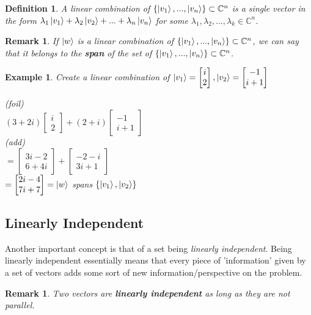 \documentclass[12pt]{article}
\theoremstyle{plain}
\theoremstyle{nonumberplain}
\theoremstyle{plain}
\newtheorem{definition}[lemma]{Definition}
\newtheorem{example}[lemma]{Example}
\newtheorem{remark}[lemma]{Remark}
\theoremstyle{nonumberplain}
\newcommand\1{{\bf 1}}
\newcommand{\bmat}[1]{\begin{bmatrix*} #1 \end{bmatrix*}} %
\newcommand{\C}{\mathbb{C}} %
\newcommand{\<}{\left\langle}
\renewcommand{\>}{\right\rangle}
\begin{document}
\begin{definition}\label{def:li}
A linear combination of $\lbrace\ket{v_1}, ..., \ket{v_n}\rbrace\subset\C^n$ is a single vector in the form $\lambda_1\ket{v_1} + \lambda_2\ket{v_2} + ... + \lambda_n\ket{v_n}$ for some $\lambda_1, \lambda_2, ... , \lambda_k\in\C^n$.
\end{definition}

\begin{remark}
If $\ket{w}$ is a linear combination of $\lbrace\ket{v_1}, ..., \ket{v_n}\rbrace\subset\C^n$, we can say that it belongs to the \textbf{span} of the set of $\lbrace\ket{v_1}, ..., \ket{v_n}\rbrace\subset\C^n$.
\end{remark}

\begin{example}
Create a linear combination of $\ket{v_1}=\bmat{i \\ 2}, \ket{v_2}=\bmat{-1 \\ i+1}$
\begin{center}
(\textit{foil}) \\
$(3+2i)\bmat{i \\ 2} + (2+i)\bmat{-1 \\ i+1}$ \\
(\textit{add}) \\
$=\bmat{3i-2 \\ 6+4i} + \bmat{-2-i \\ 3i+1}$ \\
$=\bmat{2i-4 \\ 7i+7}=\ket{w}$ \textit{spans} $\lbrace\ket{v_1}, \ket{v_2}\rbrace$
\end{center}
\end{example}


\subsection{Linearly Independent}
Another important concept is that of a set being \textit{linearly independent}. Being linearly independent essentially means that every piece of 'information' given by a set of vectors adds some sort of new information/perspective on the problem.

\begin{remark}
Two vectors are \textbf{linearly independent} as long as they are not \textit{parallel}.
\end{remark}
\end{document}

